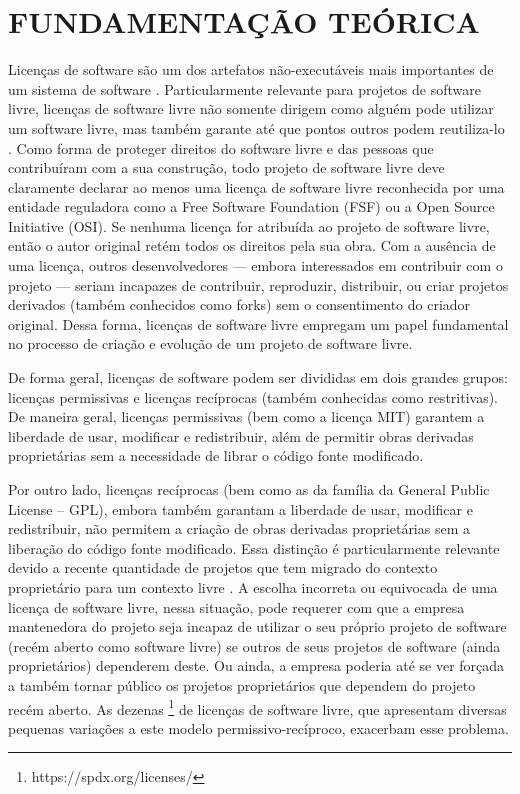 
\chapter{FUNDAMENTAÇÃO TEÓRICA}
\label{chap:fundamentacao-teorica}
Licenças de software são um dos artefatos não-executáveis mais importantes de um sistema de software \cite{KarlFogel}. Particularmente relevante para projetos de software livre, licenças de software livre não somente dirigem como alguém pode utilizar um software livre, mas também garante até que pontos outros podem reutiliza-lo \cite{KarlFogel}. Como forma de proteger direitos do software livre e das pessoas que contribuíram com a sua construção, todo projeto de software livre deve claramente declarar ao menos uma licença de software livre reconhecida por uma entidade reguladora como a Free Software Foundation (FSF) ou a Open Source Initiative (OSI). Se nenhuma licença for atribuída ao projeto de software livre, então o autor original retém todos os direitos pela sua obra. Com a ausência de uma licença, outros desenvolvedores --- embora interessados em contribuir com o projeto --- seriam incapazes de contribuir, reproduzir, distribuir, ou criar projetos derivados (também conhecidos como forks) sem o consentimento do criador original. Dessa forma, licenças de software livre empregam um papel fundamental no processo de criação e evolução de um projeto de software livre.

De forma geral, licenças de software podem ser divididas em dois grandes grupos: licenças permissivas e licenças recíprocas (também conhecidas como restritivas). De maneira geral, licenças permissivas (bem como a licença MIT) garantem a liberdade de usar, modificar e redistribuir, além de permitir obras derivadas proprietárias sem a necessidade de librar o código fonte modificado.

Por outro lado, licenças recíprocas (bem como as da família da General Public License -- GPL), embora também garantam a liberdade de usar, modificar e redistribuir, não permitem a criação de obras derivadas proprietárias sem a liberação do código fonte modificado. Essa distinção é particularmente relevante devido a recente quantidade de projetos que tem migrado do contexto proprietário para um contexto livre \cite{pinto2018}. A escolha incorreta ou equivocada de uma licença de software livre, nessa situação, pode requerer com que a empresa mantenedora do projeto seja incapaz de utilizar o seu próprio projeto de software (recém aberto como software livre) se outros de seus projetos de software (ainda proprietários) dependerem deste. Ou ainda, a empresa poderia até se ver forçada a também tornar público os projetos proprietários que dependem do projeto recém aberto. As dezenas \footnote{https://spdx.org/licenses/} de licenças de software livre, que apresentam diversas pequenas variações a este modelo permissivo-recíproco, exacerbam esse problema.



